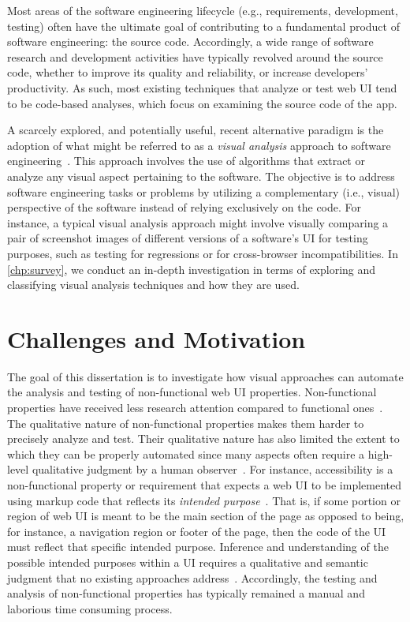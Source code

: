 Most areas of the software engineering lifecycle (e.g., requirements, 
development, testing) often have the ultimate goal of contributing to a
fundamental product of software engineering: the source code.
Accordingly, a wide range of software research and development activities have
typically revolved around the source code,
whether to improve its quality and reliability, or increase 
developers' productivity. As such, most existing techniques that analyze 
or test web UI tend to be code-based analyses, which focus on examining 
the source code of the app. 

A scarcely explored, and potentially useful, recent alternative paradigm 
is the adoption of what might be referred to as a \emph{visual analysis} 
approach to software engineering~\cite{bajammal2020survey}. 
This approach involves the use of algorithms 
that extract or analyze any visual aspect pertaining to the software. 
The objective is to address software engineering tasks or problems 
by utilizing a complementary (i.e., visual) perspective of the software 
instead of relying exclusively on the code. 
For instance, a typical visual analysis approach 
might involve visually comparing a pair of screenshot images of different 
versions of a software's UI for testing purposes, such as testing for regressions or for cross-browser incompatibilities. 
In \autoref{chp:survey}, we conduct an in-depth investigation in terms of exploring and classifying visual analysis techniques and how they are used. 
 
  
\section{Challenges and Motivation}  
The goal of this dissertation is to investigate how visual approaches can automate 
the analysis and testing of non-functional web UI properties. 
Non-functional properties have received less research attention compared to functional ones~\cite{jha2019mining,behutiye2017non}.
The qualitative nature of non-functional properties makes them harder to precisely analyze and test. 
Their qualitative nature has also limited the extent to which they can be properly automated since many aspects often require 
a high-level qualitative judgment by a human observer~\cite{acosta2018toward,bai2016evaluation}. 
For instance, accessibility is a non-functional property or requirement that expects 
a web UI to be implemented using markup code that reflects its \emph{intended purpose}~\cite{ARIA}. 
That is, if some portion or region of web UI is meant to be the main section of the page  as opposed to being, for instance, a navigation region or footer of the page, then the code of the UI must reflect that specific intended purpose. Inference and understanding of the possible intended purposes within a UI requires a qualitative and semantic judgment that no existing approaches address~\cite{bajammal2021semantic,ukgov:audit:2018}.
Accordingly, the testing and analysis of non-functional properties has typically remained 
a manual and laborious time consuming process. 

